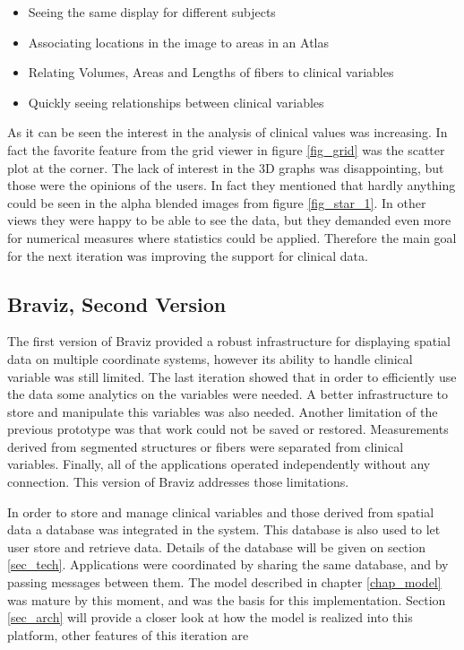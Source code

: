 \begin{itemize}
\item Seeing the same display for different subjects
\item Associating locations in the image to areas in an Atlas
\item Relating Volumes, Areas and Lengths of fibers to clinical variables
\item Quickly seeing relationships between clinical variables
\end{itemize}

As it can be seen the interest in the analysis of clinical values was increasing. In fact the favorite feature from the grid viewer in figure \ref{fig_grid} was the scatter plot at the corner. The lack of interest in the 3D graphs was disappointing, but those were the opinions of the users. In fact they mentioned that hardly anything could be seen in the alpha blended images from figure \ref{fig_star_1}. In other views they were happy to be able to see the data, but they demanded even more for numerical measures where statistics could be applied. Therefore the main goal for the next iteration was improving the support for clinical data.


\subsection{Braviz, Second Version}


The first version of Braviz provided a robust infrastructure for displaying spatial data on multiple coordinate systems, however its ability to handle clinical variable was still limited. The last iteration showed that in order to efficiently use the data  some analytics on the variables were needed. A better infrastructure to store and manipulate this variables was also needed. Another limitation of the previous prototype was that work could not be saved or restored. Measurements derived from segmented structures or fibers were separated from clinical variables. Finally, all of the applications operated independently without any connection. This version of Braviz addresses those limitations.

In order to store and manage clinical variables and those derived from spatial data a database was integrated in the system. This database is also used to let user store and retrieve data. Details of the database will be given on section \ref{sec_tech}. Applications were coordinated by sharing the same database, and by passing messages between them. The model described in chapter \ref{chap_model} was mature by this moment, and was the basis for this implementation. Section \ref{sec_arch} will provide a closer look at how the model is realized into this platform, other features of this iteration are

